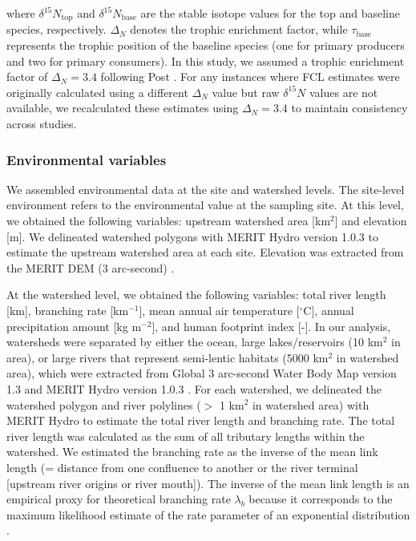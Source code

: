 \documentclass[11pt, class=article, crop=false]{standalone}
\begin{document}
where $\delta^{15}N_{\text{top}}$ and $\delta^{15}N_{\text{base}}$ are the stable isotope values for the top and baseline species, respectively.
$\Delta_{N}$ denotes the trophic enrichment factor, while $\tau_{\text{base}}$ represents the trophic position of the baseline species (one for primary producers and two for primary consumers). 
In this study, we assumed a trophic enrichment factor of $\Delta_{N} = 3.4$ following Post \citep{post_using_2002}.
For any instances where FCL estimates were originally calculated using a different $\Delta_{N}$ value but raw $\delta^{15}N$ values are not available, we recalculated these estimates using $\Delta_{N} = 3.4$ to maintain consistency across studies.

\subsubsection{Environmental variables}

We assembled environmental data at the site and watershed levels.
The site-level environment refers to the environmental value at the sampling site.
At this level, we obtained the following variables: upstream watershed area [km$^2$] and elevation [m].
We delineated watershed polygons with MERIT Hydro version 1.0.3 \citep{yamazaki_merit_2019} to estimate the upstream watershed area at each site.
Elevation was extracted from the MERIT DEM (3 arc-second) \citep{yamazaki_high-accuracy_2017}.

At the watershed level, we obtained the following variables: total river length [km], branching rate [km$^{-1}$], mean annual air temperature [$^\circ$C], annual precipitation amount [kg m$^{-2}$], and human footprint index [-].
In our analysis, watersheds were separated by either the ocean, large lakes/reservoirs (10 km$^{2}$ in area), or large rivers that represent semi-lentic habitats (5000 km$^{2}$ in watershed area), which were extracted from Global 3 arc-second Water Body Map version 1.3 \citep{yamazaki_development_2015} and MERIT Hydro version 1.0.3 \citep{yamazaki_merit_2019}.
For each watershed, we delineated the watershed polygon and river polylines ($>$ 1 km$^2$ in watershed area) with MERIT Hydro to estimate the total river length and branching rate.
The total river length was calculated as the sum of all tributary lengths within the watershed.
We estimated the branching rate as the inverse of the mean link length (= distance from one confluence to another or the river terminal [upstream river origins or river mouth]).
The inverse of the mean link length is an empirical proxy for theoretical branching rate $\lambda_b$ because it corresponds to the maximum likelihood estimate of the rate parameter of an exponential distribution \citep{terui_revisiting_2024}.
\end{document}
